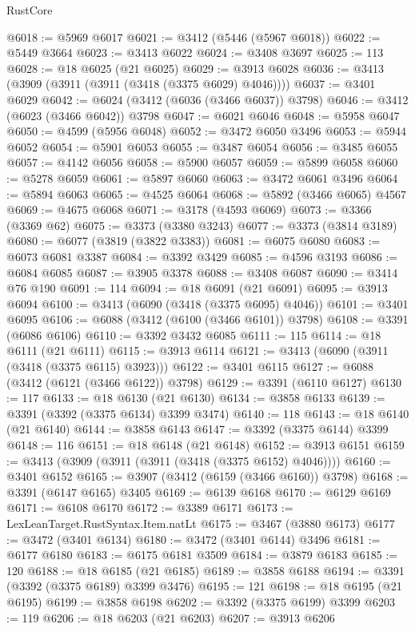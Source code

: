 \begin{lexlean}{RustCore}
\begin{coremodule}
@6018 := @5969 @6017
@6021 := @3412 (@5446 (@5967 @6018))
@6022 := @5449 @3664
@6023 := @3413 @6022
@6024 := @3408 @3697
@6025 := 113
@6028 := @18 @6025 (@21 @6025)
@6029 := @3913 @6028
@6036 := @3413 (@3909 (@3911 (@3911 (@3418 (@3375 @6029) @4046))))
@6037 := @3401 @6029
@6042 := @6024 (@3412 (@6036 (@3466 @6037)) @3798)
@6046 := @3412 (@6023 (@3466 @6042)) @3798
@6047 := @6021 @6046
@6048 := @5958 @6047
@6050 := @4599 (@5956 @6048)
@6052 := @3472 @6050 @3496
@6053 := @5944 @6052
@6054 := @5901 @6053
@6055 := @3487 @6054
@6056 := @3485 @6055
@6057 := @4142 @6056
@6058 := @5900 @6057
@6059 := @5899 @6058
@6060 := @5278 @6059
@6061 := @5897 @6060
@6063 := @3472 @6061 @3496
@6064 := @5894 @6063
@6065 := @4525 @6064
@6068 := @5892 (@3466 @6065) @4567
@6069 := @4675 @6068
@6071 := @3178 (@4593 @6069)
@6073 := @3366 (@3369 @62)
@6075 := @3373 (@3380 @3243)
@6077 := @3373 (@3814 @3189)
@6080 := @6077 (@3819 (@3822 @3383))
@6081 := @6075 @6080
@6083 := @6073 @6081 @3387
@6084 := @3392 @3429
@6085 := @4596 @3193
@6086 := @6084 @6085
@6087 := @3905 @3378
@6088 := @3408 @6087
@6090 := @3414 @76 @190
@6091 := 114
@6094 := @18 @6091 (@21 @6091)
@6095 := @3913 @6094
@6100 := @3413 (@6090 (@3418 (@3375 @6095) @4046))
@6101 := @3401 @6095
@6106 := @6088 (@3412 (@6100 (@3466 @6101)) @3798)
@6108 := @3391 (@6086 @6106)
@6110 := @3392 @3432 @6085
@6111 := 115
@6114 := @18 @6111 (@21 @6111)
@6115 := @3913 @6114
@6121 := @3413 (@6090 (@3911 (@3418 (@3375 @6115) @3923)))
@6122 := @3401 @6115
@6127 := @6088 (@3412 (@6121 (@3466 @6122)) @3798)
@6129 := @3391 (@6110 @6127)
@6130 := 117
@6133 := @18 @6130 (@21 @6130)
@6134 := @3858 @6133
@6139 := @3391 (@3392 (@3375 @6134) @3399 @3474)
@6140 := 118
@6143 := @18 @6140 (@21 @6140)
@6144 := @3858 @6143
@6147 := @3392 (@3375 @6144) @3399
@6148 := 116
@6151 := @18 @6148 (@21 @6148)
@6152 := @3913 @6151
@6159 := @3413 (@3909 (@3911 (@3911 (@3418 (@3375 @6152) @4046))))
@6160 := @3401 @6152
@6165 := @3907 (@3412 (@6159 (@3466 @6160)) @3798)
@6168 := @3391 (@6147 @6165) @3405
@6169 := @6139 @6168
@6170 := @6129 @6169
@6171 := @6108 @6170
@6172 := @3389 @6171
@6173 := LexLeanTarget.RustSyntax.Item.natLt
@6175 := @3467 (@3880 @6173)
@6177 := @3472 (@3401 @6134)
@6180 := @3472 (@3401 @6144) @3496
@6181 := @6177 @6180
@6183 := @6175 @6181 @3509
@6184 := @3879 @6183
@6185 := 120
@6188 := @18 @6185 (@21 @6185)
@6189 := @3858 @6188
@6194 := @3391 (@3392 (@3375 @6189) @3399 @3476)
@6195 := 121
@6198 := @18 @6195 (@21 @6195)
@6199 := @3858 @6198
@6202 := @3392 (@3375 @6199) @3399
@6203 := 119
@6206 := @18 @6203 (@21 @6203)
@6207 := @3913 @6206

\end{coremodule}
\end{lexlean}
